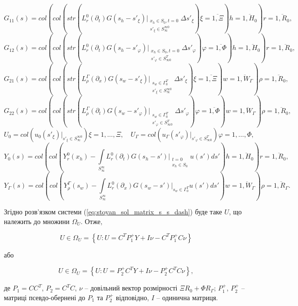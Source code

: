 \[
G_{11}(s)=col\left(col\left(str\left(L_r^0(\partial_t)G(s_h-s'_\xi)\bigg|_{\substack{x_h\in S_0,t=0 \\ s'_\xi\in S_\infty^{\infty 0}}} \Delta s'_\xi \right)\scriptstyle{\xi=\overline{1,\Xi}}\right)\scriptstyle{h=\overline{1,H_0}}\right)\scriptstyle{r=\overline{1,R_0}},
\]
\[
G_{12}(s)=col\left(col\left(str\left(L_r^0(\partial_t)G(s_h-s'_\varphi)\bigg|_{\substack{x_h\in S_0,t=0 \\ s'_\varphi\in S_{\infty 0}^{T}}} \Delta s'_\varphi \right)\scriptstyle{\varphi=\overline{1,\Phi}}\right)\scriptstyle{h=\overline{1,H_0}} \right)\scriptstyle{r=\overline{1,R_0}},
\]
\[
G_{21}(s)=col\left(col\left(str\left(L_\rho^\Gamma(\partial_x)G(s_w-s'_\xi)\bigg|_{\substack{s_w\in\Gamma_0^T \\ s'_\xi\in S_\infty^{\infty 0}}} \Delta s'_\xi \right)\scriptstyle{\xi=\overline{1,\Xi}}\right)\scriptstyle{w=\overline{1,W_\Gamma}}\right)\scriptstyle{\rho=\overline{1,R_0}},
\]
\[
G_{22}(s)=col\left(col\left(str\left(L_\rho^\Gamma(\partial_t)G(s_w-s'_\varphi)\bigg|_{\substack{s_w\in\Gamma_0^T \\ s'_\varphi\in S_{\infty 0}^{T}}} \Delta s'_\varphi \right)\scriptstyle{\varphi=\overline{1,\Phi}}\right)\scriptstyle{w=\overline{1,W_\Gamma}}\right)\scriptstyle{\rho=\overline{1,R_0}},
\]
\[
U_0=col\left(u_0(s'_\xi)\bigg|_{s'_\xi\in S_\infty^{\infty 0}}\right)\scriptstyle{\xi=1,\ldots,\Xi},\quad
U_\Gamma=col\left(u_\Gamma(s'_\varphi)\bigg|_{s'_\varphi\in S_{\infty 0}^{T}}\right)\scriptstyle{\varphi=1,\ldots,\Phi},
\]
\[
Y_0(s) = col\left(col\left(Y_r^0(x_h) - \int\limits_{S_\infty^\infty}L_r^0(\partial_t)G(s_h-s')\bigg|_{\substack{t=0 \\ x_h\in S_0}}u(s')ds' \right)\scriptstyle{h=\overline{1,H_0}} \right)\scriptstyle{r=\overline{1,R_0}},
\]
\[
Y_\Gamma(s) = col\left(col\left(Y_\rho^\Gamma(s_w) - \int\limits_{S_\infty^\infty}L_r^0(\partial_x)G(s_w-s')\bigg|_{s_w\in \Gamma_0^T}u(s')ds' \right)\scriptstyle{w=\overline{1,W_\Gamma}} \right)\scriptstyle{\rho=\overline{1,R_\Gamma}}.
\]


Згідно \cite{Blagoveshenskaya-Matematychne, Stoyan-Modeliuvannia} розв’язком системи
(\ref{eq:stoyan_sol_matrix_s_s_dash}) буде таке $U$,
що належить до множини $\Omega_U$. Отже,

\[
U\in\Omega_U = \left\{U:U=C^TP_1^+Y+I\nu-C^TP_1^+C\nu\right\}
\]

або

\[
U\in\Omega_U = \left\{U:U=P_2^+C^TY+I\nu-P_2^+C^TC\nu\right\},
\]

де $P_1=CC^T$, $P_2=C^TC$, $\nu$ – довільний вектор розмірності $\Xi R_0 + \Phi R_\Gamma$;
$P_1^+$, $P_2^+$  – матриці псевдо-обернені \cite{Gantmaher-Teoriya} до $P_1$ та $P_2^+$
відповідно, $I$ – одинична матриця.

